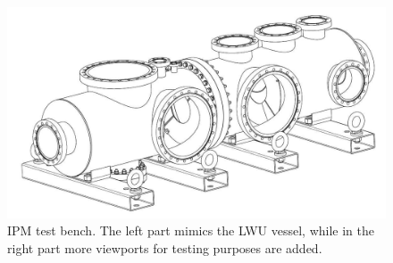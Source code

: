 \begin{figure}[!ht]
	\begin{center}
		\includegraphics[width=\textwidth]{04_IPHI_Test/figures/fig000_Testbench.png}
	\end{center}
	\caption[IPM test bench]{IPM test bench. The left part mimics the LWU vessel, while in the right part more viewports for testing purposes are added.}
	\label{chap4:Testbench}
\end{figure}
